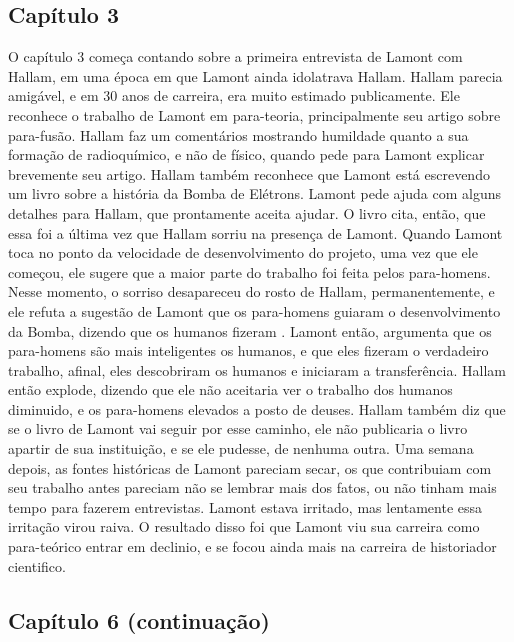 \documentclass[14pt,portuguese]{extreport}
\begin{document}
	\subsection{Capítulo 3}
	  
	  O capítulo 3 começa contando sobre a primeira entrevista de Lamont com Hallam, 
	  em uma época em que Lamont ainda idolatrava Hallam. Hallam parecia amigável, 
	  e em 30 anos de carreira, era muito estimado publicamente. Ele reconhece o trabalho 
	  de Lamont em para-teoria, principalmente seu artigo sobre para-fusão. Hallam faz um 
	  comentários mostrando humildade quanto a sua formação de radioquímico, e não de físico, 
	  quando pede para Lamont explicar brevemente seu artigo. Hallam também reconhece que 
	  Lamont está escrevendo um livro sobre a história da Bomba de Elétrons. Lamont pede ajuda 
	  com alguns detalhes para Hallam, que prontamente aceita ajudar. O livro cita, então, que 
	  essa foi a última vez que Hallam sorriu na presença de Lamont. Quando Lamont toca no ponto 
	  da velocidade de desenvolvimento do projeto, uma vez que ele começou, ele sugere que a maior 
	  parte do trabalho foi feita pelos para-homens. Nesse momento, o sorriso desapareceu do 
	  rosto de Hallam, permanentemente, e ele refuta a sugestão de Lamont que os para-homens 
	  guiaram o desenvolvimento da Bomba, dizendo que os humanos fizeram . Lamont então, argumenta 
	  que os para-homens são mais inteligentes os humanos, e que eles fizeram o verdadeiro trabalho, 
	  afinal, eles descobriram os humanos e iniciaram a transferência. Hallam então explode, dizendo 
	  que ele não aceitaria ver o trabalho dos humanos diminuido, e os para-homens elevados a posto 
	  de deuses. Hallam também diz que se o livro de Lamont vai seguir por esse caminho, ele não 
	  publicaria o livro apartir de sua instituição, e se ele pudesse, de nenhuma outra. Uma semana 
	  depois, as fontes históricas de Lamont pareciam secar, os que contribuiam com seu trabalho antes 
	  pareciam não se lembrar mais dos fatos, ou não tinham mais tempo para fazerem entrevistas. 
	  Lamont estava irritado, mas lentamente essa irritação virou raiva. O resultado disso foi que 
	  Lamont viu sua carreira como para-teórico entrar em declinio, e se focou ainda mais na carreira 
	  de historiador cientifico.


	\subsection{Capítulo 6 (continuação)}
\end{document}
